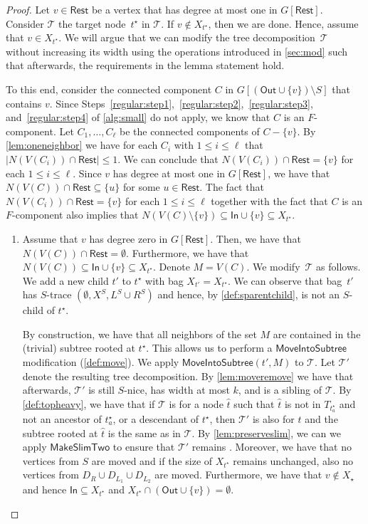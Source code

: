 \documentclass[a4paper,UKenglish,cleveref, autoref, thm-restate, numberwithinsect]{lipics-v2021}
\newcounter{modification}
\newcommand{\slim}{\text{slim}\xspace}
\newcommand{\topheavy}{\text{top-heavy}\xspace}
\newcommand{\In}{\mathsf{In}}
\newcommand{\Out}{\mathsf{Out}}
\newcommand{\Rest}{\mathsf{Rest}}
\newcommand{\MoveIntoSubtree}{\mathsf{MoveIntoSubtree}}
\newcommand{\MakeSlimTwo}{\mathsf{MakeSlimTwo}}
\begin{document}
\begin{proof}
Let $v\in\Rest$ be a vertex that has degree at most one in $G[\Rest]$. 
    Consider $\mathcal{T}$ the target node~$t^\star$ in $\mathcal{T}$.
If $v\notin X_{t^\star}$, then we are done. 
Hence, assume that $v\in X_{t^\star}$. 
We will argue that we can modify the tree decomposition~$\mathcal{T}$ without increasing its width using the operations introduced in \cref{sec:mod} such that afterwards, the requirements in the lemma statement hold.


To this end, consider the connected component $C$ in $G[(\Out\cup\{v\})\setminus S]$ that contains $v$. Since Steps~\ref{regular:step1},~\ref{regular:step2},~\ref{regular:step3}, and~\ref{regular:step4} of \cref{alg:small} do not apply, we know that $C$ is an $F$-component.
     Let $C_1,\ldots,C_\ell$ be the connected components of $C-\{v\}$. By \cref{lem:oneneighbor} we have for each $C_i$ with $1\le i\le \ell$ that $|N(V(C_i))\cap\Rest|\le 1$. We can conclude that $N(V(C_i))\cap\Rest=\{v\}$ for each $1\le i\le \ell$. Since $v$ has degree at most one in $G[\Rest]$, we have that $N(V(C))\cap \Rest\subseteq\{u\}$ for some $u\in \Rest$. 
    The fact that $N(V(C_i))\cap\Rest=\{v\}$ for each $1\le i\le \ell$ together with the fact that $C$ is an $F$-component also implies that $N(V(C)\setminus\{v\})\subseteq \In\cup\{v\}\subseteq X_{t^\star}$.

\begin{enumerate}
        \item Assume that $v$ has degree zero in $G[\Rest]$.
        Then, we have that $N(V(C))\cap \Rest=\emptyset$. Furthermore, we have that $N(V(C))\subseteq \In\cup\{v\}\subseteq X_{t^\star}$. 
        Denote $M=V(C)$. 
        We modify~$\mathcal{T}$ as follows. We add a new child $t'$ to $t^\star$ with bag $X_{t'}=X_{t^\star}$. We can observe that bag~$t'$ has $S$-trace $(\emptyset,X^S,L^S\cup R^S)$ and hence, by \cref{def:sparentchild}, is not an $S$-child of $t^\star$.
        
        
By construction, we have that all neighbors of the set $M$ are contained in the (trivial) subtree rooted at $t^\star$.
This allows us to perform a $\MoveIntoSubtree$ modification (\cref{def:move}). We apply $\MoveIntoSubtree(t',M)$ to $\mathcal{T}$. Let $\mathcal{T}'$ denote the resulting tree decomposition.
By \cref{lem:moveremove} we have that afterwards, $\mathcal{T}'$ is still $S$-nice, has width at most $k$, and is a sibling of $\mathcal{T}$. 
        By \cref{def:topheavy}, we have that
        if $\mathcal{T}$ is \topheavy for a node $\hat{t}$ such that $\hat{t}$ is not in $T_{t^\star_a}$ and not an ancestor of $t^\star_a$, or
         a descendant of $t^\star$,
then $\mathcal{T}'$ is also \topheavy for $\hat{t}$ and the subtree rooted at $\hat{t}$ is the same as in $\mathcal{T}$.
By \cref{lem:preserveslim}, we can we apply $\MakeSlimTwo$ to ensure that $\mathcal{T}'$ remains \slim.
Moreover, we have that no vertices from $S$ are moved and if the size of $X_{t^\star}$ remains unchanged, also no vertices from $D_R\cup D_{L_1}\cup D_{L_2}$ are moved.
Furthermore, we have that $v\notin X_{\star}$ and hence $\In\subseteq X_{t^{\star}}$ and $X_{t^{\star}}\cap (\Out\cup\{v\})=\emptyset$. 



\end{enumerate}
\end{proof}
\end{document}
